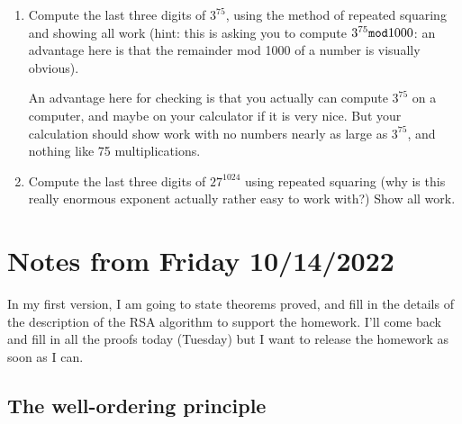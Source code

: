 \documentclass[12pt]{article}
\begin{document}
\begin{enumerate}
\item  Compute the last three digits of $3^{75}$, using the method of repeated squaring and showing all work  (hint:  this is asking you to compute $3^{75} {\tt mod} 1000$:  an advantage here is that the remainder mod 1000 of a number is visually obvious).

An advantage here for checking is that you actually can compute $3^{75}$ on a computer, and maybe on your calculator if it is very nice.  But your calculation should show work with no numbers nearly as large as $3^{75}$, and nothing like 75 multiplications.

\item Compute the last three digits of $27^{1024}$ using repeated squaring (why is this really enormous exponent actually rather easy to work with?)  Show all work.


\end{enumerate}

\section{Notes from Friday 10/14/2022}

In my first version, I am going to state theorems proved, and fill in the details of the description of the RSA algorithm to support the homework.  I'll come back and fill in all the proofs today (Tuesday) but I want to release the homework as soon as I can.

\subsection{The well-ordering principle}
\end{document}

